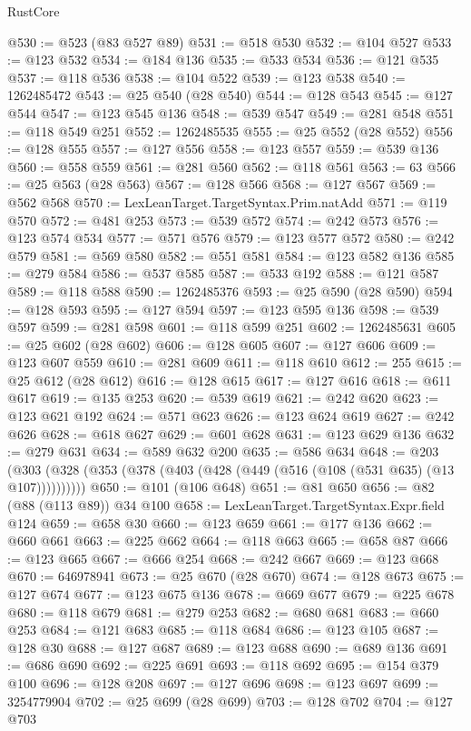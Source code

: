 \begin{lexlean}{RustCore}
\begin{coremodule}
@530 := @523 (@83 @527 @89)
@531 := @518 @530
@532 := @104 @527
@533 := @123 @532
@534 := @184 @136
@535 := @533 @534
@536 := @121 @535
@537 := @118 @536
@538 := @104 @522
@539 := @123 @538
@540 := 1262485472
@543 := @25 @540 (@28 @540)
@544 := @128 @543
@545 := @127 @544
@547 := @123 @545 @136
@548 := @539 @547
@549 := @281 @548
@551 := @118 @549 @251
@552 := 1262485535
@555 := @25 @552 (@28 @552)
@556 := @128 @555
@557 := @127 @556
@558 := @123 @557
@559 := @539 @136
@560 := @558 @559
@561 := @281 @560
@562 := @118 @561
@563 := 63
@566 := @25 @563 (@28 @563)
@567 := @128 @566
@568 := @127 @567
@569 := @562 @568
@570 := LexLeanTarget.TargetSyntax.Prim.natAdd
@571 := @119 @570
@572 := @481 @253
@573 := @539 @572
@574 := @242 @573
@576 := @123 @574 @534
@577 := @571 @576
@579 := @123 @577 @572
@580 := @242 @579
@581 := @569 @580
@582 := @551 @581
@584 := @123 @582 @136
@585 := @279 @584
@586 := @537 @585
@587 := @533 @192
@588 := @121 @587
@589 := @118 @588
@590 := 1262485376
@593 := @25 @590 (@28 @590)
@594 := @128 @593
@595 := @127 @594
@597 := @123 @595 @136
@598 := @539 @597
@599 := @281 @598
@601 := @118 @599 @251
@602 := 1262485631
@605 := @25 @602 (@28 @602)
@606 := @128 @605
@607 := @127 @606
@609 := @123 @607 @559
@610 := @281 @609
@611 := @118 @610
@612 := 255
@615 := @25 @612 (@28 @612)
@616 := @128 @615
@617 := @127 @616
@618 := @611 @617
@619 := @135 @253
@620 := @539 @619
@621 := @242 @620
@623 := @123 @621 @192
@624 := @571 @623
@626 := @123 @624 @619
@627 := @242 @626
@628 := @618 @627
@629 := @601 @628
@631 := @123 @629 @136
@632 := @279 @631
@634 := @589 @632 @200
@635 := @586 @634
@648 := @203 (@303 (@328 (@353 (@378 (@403 (@428 (@449 (@516 (@108 (@531 @635) (@13 @107))))))))))
@650 := @101 (@106 @648)
@651 := @81 @650
@656 := @82 (@88 (@113 @89)) @34 @100
@658 := LexLeanTarget.TargetSyntax.Expr.field @124
@659 := @658 @30
@660 := @123 @659
@661 := @177 @136
@662 := @660 @661
@663 := @225 @662
@664 := @118 @663
@665 := @658 @87
@666 := @123 @665
@667 := @666 @254
@668 := @242 @667
@669 := @123 @668
@670 := 646978941
@673 := @25 @670 (@28 @670)
@674 := @128 @673
@675 := @127 @674
@677 := @123 @675 @136
@678 := @669 @677
@679 := @225 @678
@680 := @118 @679
@681 := @279 @253
@682 := @680 @681
@683 := @660 @253
@684 := @121 @683
@685 := @118 @684
@686 := @123 @105
@687 := @128 @30
@688 := @127 @687
@689 := @123 @688
@690 := @689 @136
@691 := @686 @690
@692 := @225 @691
@693 := @118 @692
@695 := @154 @379 @100
@696 := @128 @208
@697 := @127 @696
@698 := @123 @697
@699 := 3254779904
@702 := @25 @699 (@28 @699)
@703 := @128 @702
@704 := @127 @703

\end{coremodule}
\end{lexlean}
